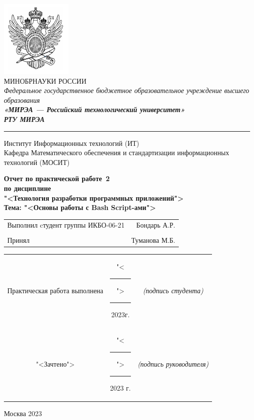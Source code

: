 \begin{center}
	\includegraphics[scale=0.5]{./res/logo.png}\\
	\normalsize{МИНОБРНАУКИ РОССИИ}\\
	\normalsize{\itshape Федеральное государственное бюджетное образовательное учреждение высшего образования}\\
	\normalsize{\bfseries\itshape«МИРЭА --- Российский технологический университет»}\\
	\large{\bfseries\itshape РТУ МИРЭА}\\
	\bigskip \hrule \smallskip
	\normalsize{Институт Информационных технологий (ИТ)}\\
	\vfill
	\normalsize{Кафедра Математического обеспечения и стандартизации информационных технологий (МОСИТ)}\\
	\vfill
	\begin{normalsize}
	  \textbf{
	    Отчет по практической работе \No\,2\\
	    по дисциплине\\
	    "<Технология разработки программных приложений">\\
	    Тема: "<Основы работы с Bash Script-ами">\\
	  }
	\end{normalsize}
	\vfill
	\vfill
	\begin{small}
		\begin{tabular}{lr}
			Выполнил cтудент группы ИКБО-06-21 & Бондарь А.Р.\\\\
			Принял & Туманова М.Б.\\
		\end{tabular}
	\end{small}
	\vfill
	\begin{footnotesize}
		\begin{tabular}{ccc}
			Практическая  работа выполнена
			& "<\rule{1ex}{.5pt}">\rule{7ex}{.5pt}2023г.
			& \textit{(подпись студента)}\\
			"<Зачтено"> 
			& "<\rule{1ex}{.5pt}">\rule{7ex}{.5pt}2023 г.
			& \textit{(подпись руководителя)}\\
		\end{tabular}
	\end{footnotesize}
	\vfill
\end{center}

\begin{center} Москва 2023 \end{center}

\thispagestyle{empty}
